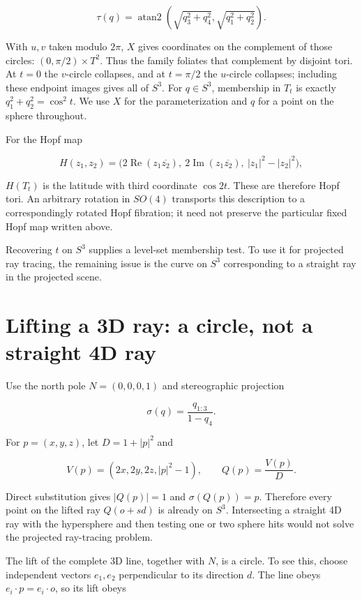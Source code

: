 \documentclass[11pt,a4paper]{article}
\begin{document}
\[
\tau(q)=\operatorname{atan2}\!\left(\sqrt{q_3^2+q_4^2},\sqrt{q_1^2+q_2^2}\right).
\]

With \(u,v\) taken modulo \(2\pi\), \(X\) gives coordinates on the
complement of those circles: \((0,\pi/2)\times T^2\). Thus the family
foliates that complement by disjoint tori. At \(t=0\) the \(v\)-circle
collapses, and at \(t=\pi/2\) the \(u\)-circle collapses; including
these endpoint images gives all of \(S^3\). For \(q\in S^3\), membership
in \(T_t\) is exactly \(q_1^2+q_2^2=\cos^2t\). We use \(X\) for the
parameterization and \(q\) for a point on the sphere throughout.

For the Hopf map

\[
H(z_1,z_2)=\bigl(2\operatorname{Re}(z_1\overline{z_2}),\ 2\operatorname{Im}(z_1\overline{z_2}),\ |z_1|^2-|z_2|^2\bigr),
\]

\(H(T_t)\) is the latitude with third coordinate \(\cos 2t\). These are
therefore Hopf tori. An arbitrary rotation in \(SO(4)\) transports this
description to a correspondingly rotated Hopf fibration; it need not
preserve the particular fixed Hopf map written above.

Recovering \(t\) on \(S^3\) supplies a level-set membership test. To use
it for projected ray tracing, the remaining issue is the curve on
\(S^3\) corresponding to a straight ray in the projected scene.

\section{Lifting a 3D ray: a circle, not a straight 4D
ray}\label{lifting-a-3d-ray-a-circle-not-a-straight-4d-ray}

Use the north pole \(N=(0,0,0,1)\) and stereographic projection

\[
\sigma(q)=\frac{q_{1:3}}{1-q_4}.
\]

For \(p=(x,y,z)\), let \(D=1+|p|^2\) and

\[
V(p)=(2x,2y,2z,|p|^2-1),\qquad Q(p)=\frac{V(p)}D.
\]

Direct substitution gives \(|Q(p)|=1\) and \(\sigma(Q(p))=p\). Therefore
every point on the lifted ray \(Q(o+s d)\) is already on \(S^3\).
Intersecting a straight 4D ray with the hypersphere and then testing one
or two sphere hits would not solve the projected ray-tracing problem.

The lift of the complete 3D line, together with \(N\), is a circle. To
see this, choose independent vectors \(e_1,e_2\) perpendicular to its
direction \(d\). The line obeys \(e_i\cdot p=e_i\cdot o\), so its lift
obeys
\end{document}
